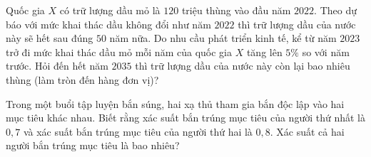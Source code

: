 \begin{bt}%
	Quốc gia $X$ có trữ lượng dầu mỏ là $120$ triệu thùng vào đầu năm $2022$. Theo dự báo với mức khai thác dầu không đổi như năm $2022$ thì trữ lượng dầu của nước này sẽ hết sau đúng $50$ năm nữa. Do nhu cầu phát triển kinh tế, kể từ năm $2023$ trở đi mức khai thác dầu mỏ mỗi năm của quốc gia $X$ tăng lên $5 \%$ so với năm trước. Hỏi đến hết năm $2035$ thì trữ lượng dầu của nước này còn lại bao nhiêu thùng (làm tròn đến hàng đơn vị)?
\end{bt}

\begin{ex}%
	Trong một buổi tập luyện bắn súng, hai xạ thủ tham gia bắn độc lập vào hai mục tiêu khác nhau. Biết rằng xác suất bắn trúng mục tiêu của người thứ nhất là $0{,}7$ và xác suất bắn trúng mục tiêu của người thứ hai là $0{,}8$. Xác suất cả hai người bắn trúng mục tiêu là bao nhiêu?
\end{ex}

